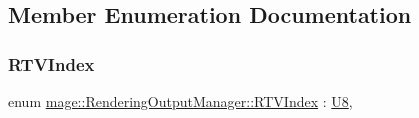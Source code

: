 \subsection{Member Enumeration Documentation}
\hypertarget{classmage_1_1_rendering_output_manager_a776a03191e0a424d8e014414d9d44cef}{}\label{classmage_1_1_rendering_output_manager_a776a03191e0a424d8e014414d9d44cef} 
\subsubsection{\texorpdfstring{R\+T\+V\+Index}{RTVIndex}}
{\footnotesize\ttfamily enum \hyperlink{classmage_1_1_rendering_output_manager_a776a03191e0a424d8e014414d9d44cef}{mage\+::\+Rendering\+Output\+Manager\+::\+R\+T\+V\+Index} \+: \hyperlink{namespacemage_afc638980bc6154f15af5e2d93a0e0ea9}{U8}\hspace{0.3cm}{\ttfamily [strong]}, {\ttfamily [private]}}

